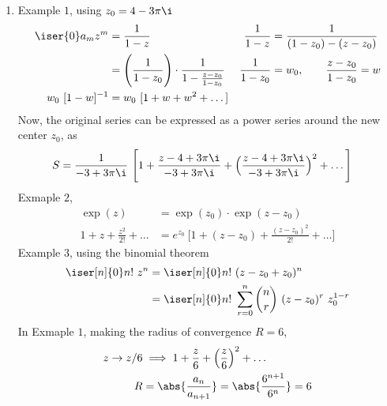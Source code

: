 \begin{enumerate}
    \item Example $ 1 $, using $ z_0 = 4 - 3\pi \i $
          \begin{align}
              \iser{0} a_m z^m    & = \frac{1}{1-z}                           &
              \frac{1}{1 - z}     & = \frac{1}{(1 - z_0) - (z - z_0)}           \\
                                  & = \Bigg(\frac{1}{1-z_0}\Bigg)
              \cdot\frac{1}{1 - \frac{z-z_0}
              {1-z_0}}            &
              \frac{1}{1 - z_0}   & = w_0, \qquad \frac{z - z_0}{1 - z_0} = w   \\
              w_0\ [ 1 - w ]^{-1} & = w_0\ [1 + w + w^2 + \dots]
          \end{align}
          Now, the original series can be expressed as a power series around the new
          center $ z_0 $, as
          \begin{align}
              S & = \frac{1}{-3 + 3\pi\i}\ \Bigg[ 1 + \frac{z - 4 + 3\pi\i}{-3 + 3\pi\i}
                  + \Big( \frac{z - 4 + 3\pi\i}{-3 + 3\pi\i} \Big)^2 + \dots \Bigg]
          \end{align}
          Exmaple $ 2 $,
          \begin{align}
              \exp(z)                        & = \exp(z_0) \cdot \exp(z - z_0) \\
              1 + z + \frac{z^2}{2!} + \dots & = e^{z_0}\ \Bigg[
                  1 + (z - z_0) + \frac{(z - z_0)^2}{2!} + \dots \Bigg]
          \end{align}
          Example $ 3 $, using the binomial theorem
          \begin{align}
              \iser[n]{0} n!\ z^n & = \iser[n]{0} n!\ (z - z_0 + z_0)^n \\
                                  & = \iser[n]{0} n!
              \ \sum_{r=0}^{n}\binom{n}{r}\
              (z - z_0)^r\ z_0^{1-r}
          \end{align}
          In Exmaple $ 1 $, making the radius of convergence $ R = 6 $,
          \begin{align}
              z \to z/6 & \implies 1 + \frac{z}{6} + \Big( \frac{z}{6} \Big)^2
              + \dots                                                               \\
              R         & = \abs{\frac{a_{n}}{a_{n+1}}} = \abs{\frac{6^{n+1}}{6^n}}
              = 6
          \end{align}


\end{enumerate}
